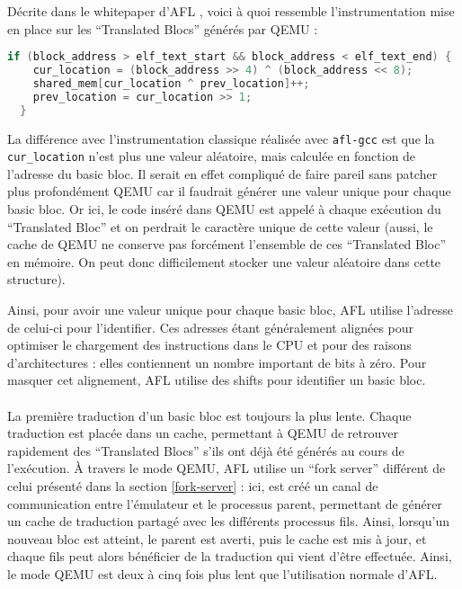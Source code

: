 Décrite dans le whitepaper d'AFL \cite[section 12 : ``Binary only instrumentation'']{technical-details}, voici à quoi ressemble l'instrumentation mise en place sur les ``Translated Blocs'' générés par QEMU :
\begin{lstlisting}[language=C]
  if (block_address > elf_text_start && block_address < elf_text_end) {
    cur_location = (block_address >> 4) ^ (block_address << 8);
    shared_mem[cur_location ^ prev_location]++;
    prev_location = cur_location >> 1;
  }
\end{lstlisting}

La différence avec l'instrumentation classique réalisée avec \lstinline{afl-gcc} est que la \lstinline{cur_location} n'est plus une valeur aléatoire, mais calculée en fonction de l'adresse du basic bloc.
Il serait en effet compliqué de faire pareil sans patcher plus profondément QEMU car il faudrait générer une valeur unique pour chaque basic bloc.
Or ici, le code inséré dans QEMU est appelé à chaque exécution du ``Translated Bloc'' et on perdrait le caractère unique de cette valeur (aussi, le cache de QEMU ne conserve pas forcément l'ensemble de ces ``Translated Bloc'' en mémoire. On peut donc difficilement stocker une valeur aléatoire dans cette structure).

Ainsi, pour avoir une valeur unique pour chaque basic bloc, AFL utilise l'adresse de celui-ci pour l'identifier.
Ces adresses étant généralement alignées pour optimiser le chargement des instructions dans le CPU et pour des raisons d'architectures : elles contiennent un nombre important de bits à zéro.
Pour masquer cet alignement, AFL utilise des shifts pour identifier un basic bloc.


\paragraph{}
La première traduction d'un basic bloc est toujours la plus lente.
Chaque traduction est placée dans un cache, permettant à QEMU de retrouver rapidement des ``Translated Blocs'' s'ils ont déjà été générés au cours de l'exécution.
À travers le mode QEMU, AFL utilise un ``fork server'' différent de celui présenté dans la section \ref{fork-server} : ici, est créé un canal de communication entre l'émulateur et le processus parent, permettant de générer un cache de traduction partagé avec les différents processus fils.
Ainsi, lorsqu'un nouveau bloc est atteint, le parent est averti, puis le cache est mis à jour, et chaque fils peut alors bénéficier de la traduction qui vient d'être effectuée.
Ainsi, le mode QEMU est deux à cinq fois plus lent que l'utilisation normale d'AFL.

